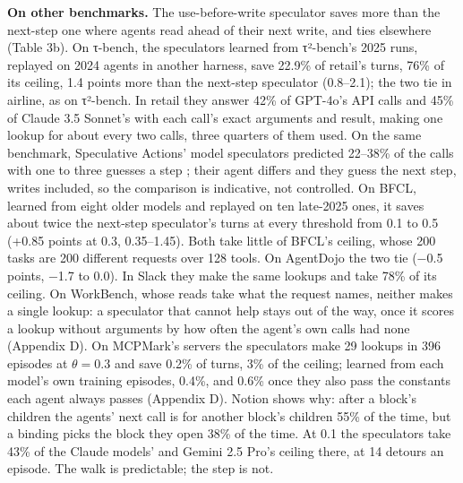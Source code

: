 \documentclass[10pt,twocolumn,letterpaper]{article}
\newcommand{\runin}[1]{{\sffamily\bfseries\color{accent}#1}}
\begin{document}
\runin{On other benchmarks.} The use-before-write speculator saves more than the next-step one where agents read ahead of their next write, and ties elsewhere (Table 3b). On τ-bench, the speculators learned from τ²-bench's 2025 runs, replayed on 2024 agents in another harness, save 22.9\% of retail's turns, 76\% of its ceiling, 1.4 points more than the next-step speculator (0.8--2.1); the two tie in airline, as on τ²-bench. In retail they answer 42\% of GPT-4o's API calls and 45\% of Claude 3.5 Sonnet's with each call's exact arguments and result, making one lookup for about every two calls, three quarters of them used. On the same benchmark, Speculative Actions' model speculators predicted 22--38\% of the calls with one to three guesses a step \citep{ye2026speculativeactions}; their agent differs and they guess the next step, writes included, so the comparison is indicative, not controlled. On BFCL, learned from eight older models and replayed on ten late-2025 ones, it saves about twice the next-step speculator's turns at every threshold from 0.1 to 0.5 (+0.85 points at 0.3, 0.35--1.45). Both take little of BFCL's ceiling, whose 200 tasks are 200 different requests over 128 tools. On AgentDojo the two tie (−0.5 points, −1.7 to 0.0). In Slack they make the same lookups and take 78\% of its ceiling. On WorkBench, whose reads take what the request names, neither makes a single lookup: a speculator that cannot help stays out of the way, once it scores a lookup without arguments by how often the agent's own calls had none (Appendix D). On MCPMark's servers the speculators make 29 lookups in 396 episodes at \(\theta = 0.3\) and save 0.2\% of turns, 3\% of the ceiling; learned from each model's own training episodes, 0.4\%, and 0.6\% once they also pass the constants each agent always passes (Appendix D). Notion shows why: after a block's children the agents' next call is for another block's children 55\% of the time, but a binding picks the block they open 38\% of the time. At 0.1 the speculators take 43\% of the Claude models' and Gemini 2.5 Pro's ceiling there, at 14 detours an episode. The walk is predictable; the step is not.
\end{document}
